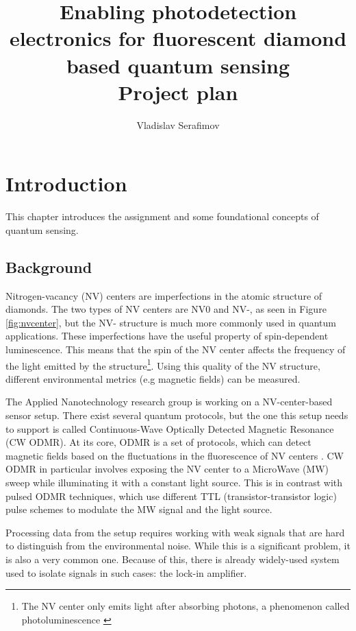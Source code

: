 \documentclass{report}
\title{Enabling photodetection electronics for 
	fluorescent diamond based quantum sensing \\Project plan}
\author{Vladislav Serafimov}
\begin{document}
	\maketitle
	
	\tableofcontents
	
	\chapter{Introduction}
	This chapter introduces the assignment and some foundational concepts of quantum sensing.
	
	\section{Background}\label{chap:background}
	Nitrogen-vacancy (NV) centers \cite{enwiki:1301369588} are imperfections in the atomic structure of diamonds. The two types of NV centers are NV0 and NV-, as seen in Figure \ref{fig:nvcenter}, but the NV- structure is much more commonly used in quantum applications. These imperfections have the useful property of spin-dependent luminescence. This means that the spin of the NV center affects the frequency of the light emitted by the structure\footnote{The NV center only emits light after absorbing photons, a phenomenon called photoluminescence \cite{enwiki:1309081879}}. Using this quality of the NV structure, different environmental metrics (e.g magnetic fields) can be measured. 
	
	The Applied Nanotechnology research group is working on a NV-center-based sensor setup. There exist several quantum protocols, but the one this setup needs to support is called Continuous-Wave Optically Detected Magnetic Resonance (CW ODMR). At its core, ODMR is a set of protocols, which can detect magnetic fields based on the fluctuations in the fluorescence of NV centers \cite{enwiki:1301371272}. CW ODMR in particular involves exposing the NV center to a MicroWave (MW) sweep while illuminating it with a constant light source. This is in contrast with pulsed ODMR techniques, which use different TTL (transistor-transistor logic) pulse schemes \cite{sewani2020coherent} to modulate the MW signal and the light source.
	
 	Processing data from the setup requires working with weak signals that are hard to distinguish from the environmental noise. While this is a significant problem, it is also a very common one. Because of this, there is already widely-used system used to isolate signals in such cases: the lock-in amplifier.
	
\end{document}
